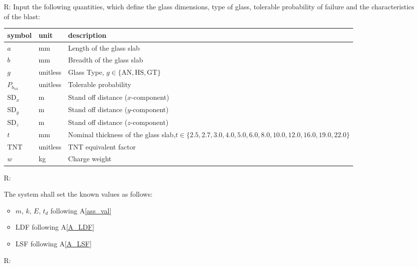\documentclass[12pt]{article}
\newcommand{\aref}[1]{A\ref{#1}}
\newcounter{reqnum} %
\begin{document}
\noindent \begin{itemize}

\item[R\refstepcounter{reqnum}\thereqnum \label{Input}:] Input the following
  quantities, which define the glass dimensions, type of glass, tolerable probability of
  failure and the characteristics of the blast:

\renewcommand{\arraystretch}{1.2}
\begin{tabular}{l l p{11cm}} 
\toprule
\textbf{symbol} & \textbf{unit} & \textbf{description}\\
\midrule 
$a$ & \si{\milli\metre}	& Length of the glass slab\\
$b$ & \si{\milli\metre}	& Breadth of the glass slab\\
$g$ & unitless & Glass Type, $g \in \{ \text{AN}, \text{HS}, \text{GT} \}$\\
$P_{b_{\text{tol}}}$ & unitless & Tolerable probability\\
$\text{SD}_x$ & \si{\meter} & Stand off distance ($x$-component)\\
$\text{SD}_y$ & \si{\metre} & Stand off distance ($y$-component)\\
$\text{SD}_z$ & \si{\metre} & Stand off distance ($z$-component)\\
$t$ & \si{\milli\metre}	& Nominal thickness of the glass slab,\newline $t \in
                                  \{2.5, 2.7, 3.0, 4.0, 5.0, 6.0, 8.0, 10.0,
                                  12.0, 16.0, 19.0, 22.0\}$ \\
$\text{TNT}$ & unitless & TNT equivalent factor\\
$w$ & \si{\kilo\gram}	& Charge weight\\
\bottomrule
\end{tabular}

\item [R\refstepcounter{reqnum}\thereqnum \label{KnownValues}:]

The system shall set the known values as follows:
\begin{itemize}
\item $m$, $k$, $E$, $t_d$ following \aref{ass_val}
\item LDF following \aref{A_LDF}
\item LSF following \aref{A_LSF}
\end{itemize}

\item[R\refstepcounter{reqnum}\thereqnum \label{Verify}:]


\end{itemize}
\end{document}
